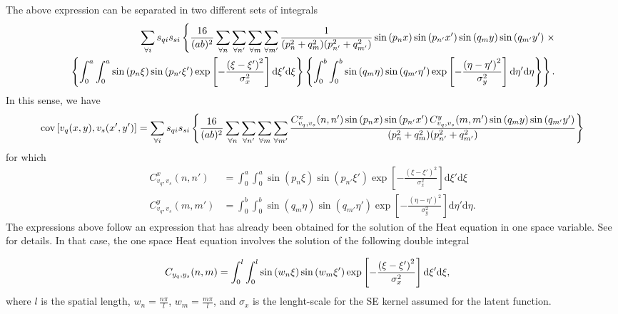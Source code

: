 \documentclass[a4paper,10pt]{article}
\newcommand{\dif}{\textrm{d}}
\DeclareMathOperator{\cov}{cov} \DeclareMathOperator{\ex}{E}
\begin{document}
The above expression can be separated in two different sets of integrals
\begin{align}\notag
\sum_{\forall i}s_{qi}s_{si}\left\{\frac{16}{(ab)^2}\sum_{\forall
  n}\sum_{\forall n'}\sum_{\forall m}\sum_{\forall m'}
\frac{1}{(p_n^2 + q_m^2)(p_{n'}^2 + q_{m'}^2)}
\sin\left(p_nx\right)
\sin\left(p_{n'}x'\right) \sin\left(q_my\right)
\sin\left(q_{m'}y'\right)\right.\times\\\notag
\left.
\left\{\int_0^a\int_0^a\sin\left(p_n\xi\right)
\sin\left(p_{n'}\xi'\right)\exp\left[-\frac{\left(\xi-\xi'\right)^2}{\sigma^2_x}\right]\dif\xi'\dif\xi\right\}
\left\{\int_0^b\int_0^b\sin\left(q_m \eta\right)
\sin\left(q_{m'}\eta'\right)\exp\left[-\frac{\left(\eta-\eta'\right)^2}{\sigma^2_y}\right]\dif\eta'\dif\eta\right\}\right\}.
\end{align}
In this sense, we have
\begin{align}\notag
\cov\left[v_q(x,y),v_s(x',y')\right]=
\sum_{\forall i}s_{qi}s_{si}\left\{\frac{16}{(ab)^2}\sum_{\forall
  n}\sum_{\forall n'}\sum_{\forall m}\sum_{\forall m'}
\frac{C^x_{v_q,v_s}(n,n') \sin\left(p_nx\right)
\sin\left(p_{n'}x'\right) C^y_{v_q,v_s}(m,m') \sin\left(q_my\right)
\sin\left(q_{m'}y'\right)}{(p_n^2 + q_m^2)(p_{n'}^2 + q_{m'}^2)}
\right\}
\end{align}
for which
\begin{align}
C^x_{v_q,v_s}(n,n')&=\int_0^a\int_0^a\sin\left(p_n\xi\right)
\sin\left(p_{n'}\xi'\right)\exp\left[-\frac{\left(\xi-\xi'\right)^2}{\sigma^2_x}\right]\dif\xi'\dif\xi\label{eq:Cvvnnp}\\
C^y_{v_q,v_s}(m,m')&=\int_0^b\int_0^b\sin\left(q_m\eta\right)
\sin\left(q_{m'}\eta'\right)\exp\left[-\frac{\left(\eta-\eta'\right)^2}{\sigma^2_y}\right]\dif\eta'\dif\eta.
\end{align}
The expressions above follow an expression that has already been obtained for
the solution of the Heat equation in one space variable. See
\cite{Alvarez:HeatEquationReport} for details. In that case, the one
space Heat equation involves the solution of the following double
integral

\begin{align}\notag
C_{y_q,y_s}(n,m)&=\int_0^l\int_0^l\sin\left(w_n\xi\right)
\sin\left(w_m\xi'\right)\exp\left[-\frac{\left(\xi-\xi'\right)^2}{\sigma^2_x}\right]\dif\xi'\dif\xi,
\end{align}
where $l$ is the spatial length, $w_n= \frac{n\pi}{l}$,
$w_m=\frac{m\pi}{l}$, and $\sigma_x$ is the lenght-scale for the SE
kernel assumed for the latent function.
\end{document}
